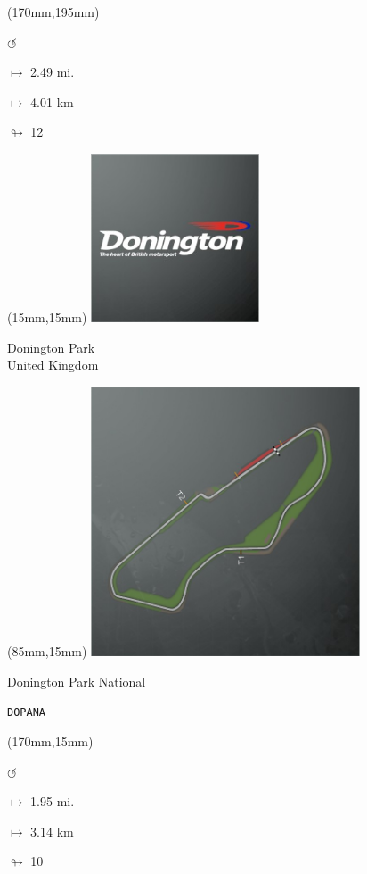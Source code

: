 \begin{textblock*}{30mm}(170mm,195mm)%
\par \Huge$\circlearrowleft$
\Large
\par$\mapsto$ 2.49 mi.
\par$\mapsto$ 4.01 km
\par$\looparrowright$ 12
\end{textblock*}
\null\newpage

\begin{textblock*}{60mm}(15mm,15mm)%
\includegraphics[width=50mm]{LG/2015-05-20_00080.png}
\par Donington Park\\ United Kingdom
\end{textblock*}
\begin{textblock*}{80mm}(85mm,15mm)%
\includegraphics[width=80mm]{TR/2015-05-20_00023.png}
\centerline{Donington Park National}
\par\hfill\tiny\tt DOPANA\\
\end{textblock*}
\begin{textblock*}{30mm}(170mm,15mm)%
\par \Huge$\circlearrowleft$
\Large
\par$\mapsto$ 1.95 mi.
\par$\mapsto$ 3.14 km
\par$\looparrowright$ 10
\end{textblock*}
